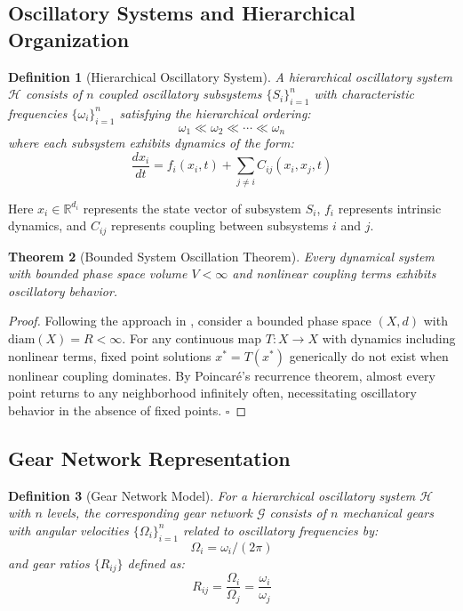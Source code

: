 \documentclass[11pt]{article}
\newtheorem{theorem}{Theorem}[section]
\newtheorem{definition}[theorem]{Definition}
\theoremstyle{remark}
\begin{document}
\subsection{Oscillatory Systems and Hierarchical Organization}

\begin{definition}[Hierarchical Oscillatory System]
A hierarchical oscillatory system $\mathcal{H}$ consists of $n$ coupled oscillatory subsystems $\{S_i\}_{i=1}^{n}$ with characteristic frequencies $\{\omega_i\}_{i=1}^{n}$ satisfying the hierarchical ordering:
\begin{equation}
\omega_1 \ll \omega_2 \ll \cdots \ll \omega_n
\label{eq:hierarchical_ordering}
\end{equation}
where each subsystem exhibits dynamics of the form:
\begin{equation}
\frac{dx_i}{dt} = f_i(x_i, t) + \sum_{j \neq i} C_{ij}(x_i, x_j, t)
\label{eq:oscillatory_dynamics}
\end{equation}
\end{definition}

Here $x_i \in \mathbb{R}^{d_i}$ represents the state vector of subsystem $S_i$, $f_i$ represents intrinsic dynamics, and $C_{ij}$ represents coupling between subsystems $i$ and $j$.

\begin{theorem}[Bounded System Oscillation Theorem]
Every dynamical system with bounded phase space volume $V < \infty$ and nonlinear coupling terms exhibits oscillatory behavior.
\end{theorem}

\begin{proof}
Following the approach in \cite{poincare1890probleme}, consider a bounded phase space $(X, d)$ with $\text{diam}(X) = R < \infty$. For any continuous map $T: X \to X$ with dynamics including nonlinear terms, fixed point solutions $x^* = T(x^*)$ generically do not exist when nonlinear coupling dominates. By Poincaré's recurrence theorem, almost every point returns to any neighborhood infinitely often, necessitating oscillatory behavior in the absence of fixed points. $\square$
\end{proof}

\subsection{Gear Network Representation}

\begin{definition}[Gear Network Model]
For a hierarchical oscillatory system $\mathcal{H}$ with $n$ levels, the corresponding gear network $\mathcal{G}$ consists of $n$ mechanical gears with angular velocities $\{\Omega_i\}_{i=1}^{n}$ related to oscillatory frequencies by:
\begin{equation}
\Omega_i = \omega_i / (2\pi)
\label{eq:frequency_gear_mapping}
\end{equation}
and gear ratios $\{R_{ij}\}$ defined as:
\begin{equation}
R_{ij} = \frac{\Omega_i}{\Omega_j} = \frac{\omega_i}{\omega_j}
\label{eq:gear_ratio_definition}
\end{equation}
\end{definition}
\end{document}
